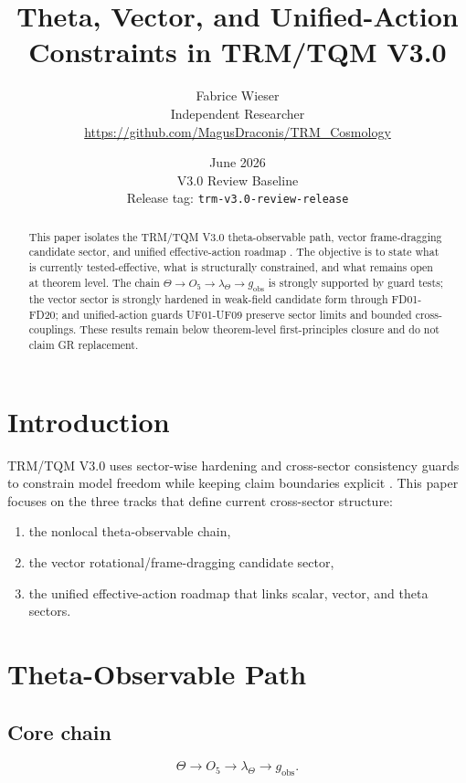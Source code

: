 \documentclass[11pt,a4paper]{article}
\title{Theta, Vector, and Unified-Action Constraints in TRM/TQM V3.0}
\author{
Fabrice Wieser\\
Independent Researcher\\
\url{https://github.com/MagusDraconis/TRM_Cosmology}
}
\date{June 2026\\
V3.0 Review Baseline\\
Release tag: \texttt{trm-v3.0-review-release}}
\begin{document}
\maketitle

\begin{abstract}
This paper isolates the TRM/TQM V3.0 theta-observable path, vector frame-dragging candidate sector, and unified effective-action roadmap \cite{theta_theorem_path,vector_extension,unified_action_roadmap,trm_status_v3}. The objective is to state what is currently tested-effective, what is structurally constrained, and what remains open at theorem level. The chain \(\Theta \rightarrow O_5 \rightarrow \lambda_\Theta \rightarrow g_{\mathrm{obs}}\) is strongly supported by guard tests; the vector sector is strongly hardened in weak-field candidate form through FD01-FD20; and unified-action guards UF01-UF09 preserve sector limits and bounded cross-couplings. These results remain below theorem-level first-principles closure and do not claim GR replacement.
\end{abstract}

\section{Introduction}

TRM/TQM V3.0 uses sector-wise hardening and cross-sector consistency guards to constrain model freedom while keeping claim boundaries explicit \cite{trm_status_v3}. This paper focuses on the three tracks that define current cross-sector structure:
\begin{enumerate}
  \item the nonlocal theta-observable chain,
  \item the vector rotational/frame-dragging candidate sector,
  \item the unified effective-action roadmap that links scalar, vector, and theta sectors.
\end{enumerate}

\section{Theta-Observable Path}

\subsection{Core chain}

\[
\Theta \rightarrow O_5 \rightarrow \lambda_\Theta \rightarrow g_{\mathrm{obs}}.
\]
\end{document}
